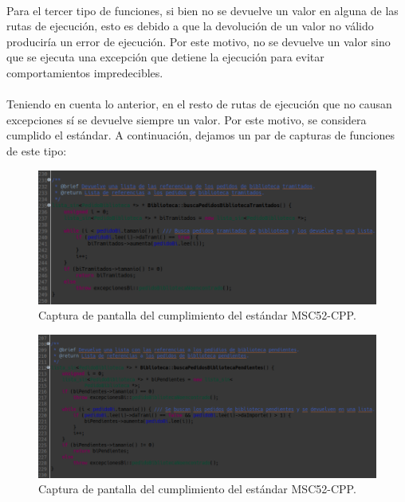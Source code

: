 			\paragraph{}Para el tercer tipo de funciones, si bien no se devuelve un valor en alguna de las rutas de ejecución, esto es debido a que la devolución de un valor no válido produciría un error de ejecución. Por este motivo, no se devuelve un valor sino que se ejecuta una excepción que detiene la ejecución para evitar comportamientos impredecibles.
			
			\paragraph{}Teniendo en cuenta lo anterior, en el resto de rutas de ejecución que no causan excepciones sí se devuelve siempre un valor. Por este motivo, se considera cumplido el estándar. A continuación, dejamos un par de capturas de funciones de este tipo: 
			
			\begin{figure}[H]
				\centering
				\includegraphics[scale=0.5]{img/captura36.png}
				\caption{Captura de pantalla del cumplimiento del estándar MSC52-CPP.}
				\label{captura36}
			\end{figure}
			
			\begin{figure}[H]
				\centering
				\includegraphics[scale=0.45]{img/captura37.png}
				\caption{Captura de pantalla del cumplimiento del estándar MSC52-CPP.}
				\label{captura37}
			\end{figure}

